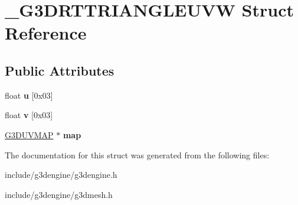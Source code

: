 \hypertarget{struct__G3DRTTRIANGLEUVW}{}\section{\+\_\+\+G3\+D\+R\+T\+T\+R\+I\+A\+N\+G\+L\+E\+U\+VW Struct Reference}
\label{struct__G3DRTTRIANGLEUVW}
\subsection*{Public Attributes}
\begin{DoxyCompactItemize}
\item 
\mbox{\label{struct__G3DRTTRIANGLEUVW_aed68fba82dcabbd2bb2d37e5777c67f6}} 
float {\bfseries u} \mbox{[}0x03\mbox{]}
\item 
\mbox{\label{struct__G3DRTTRIANGLEUVW_a8dc035449cb871c27da77d55be52bb35}} 
float {\bfseries v} \mbox{[}0x03\mbox{]}
\item 
\mbox{\label{struct__G3DRTTRIANGLEUVW_a9712808a18c63fb29641f3fa3cd3295f}} 
\hyperlink{struct__G3DUVMAP}{G3\+D\+U\+V\+M\+AP} $\ast$ {\bfseries map}
\end{DoxyCompactItemize}


The documentation for this struct was generated from the following files\+:\begin{DoxyCompactItemize}
\item 
include/g3dengine/g3dengine.\+h\item 
include/g3dengine/g3dmesh.\+h\end{DoxyCompactItemize}
